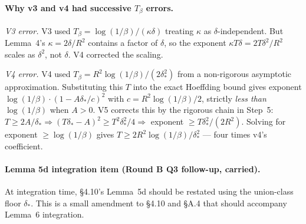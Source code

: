 \documentclass{article}
\newcommand{\deltastar}{\delta_{*}}
\newcommand{\Tbeta}{T_{\beta}}
\begin{document}
\paragraph{Why v3 and v4 had successive $\Tbeta$ errors.}
\emph{V3 error.}  V3 used $\Tbeta = \log(1/\beta)/(\kappa \delta)$
treating $\kappa$ as $\delta$-independent.  But Lemma~4's
$\kappa = 2\delta/R^2$ contains a factor of $\delta$, so the exponent
$\kappa T \delta = 2T\delta^2/R^2$ scales as $\delta^2$, not
$\delta$.  V4 corrected the scaling.

\emph{V4 error.}  V4 used $\Tbeta = R^2\log(1/\beta)/(2\deltastar^2)$
from a non-rigorous asymptotic approximation.  Substituting this
$T$ into the exact Hoeffding bound gives exponent $\log(1/\beta)
\cdot (1 - A\deltastar/c)^2$ with $c = R^2\log(1/\beta)/2$, strictly
\emph{less than} $\log(1/\beta)$ when $A > 0$.  V5 corrects this by
the rigorous chain in Step~5: $T \geq 2A/\deltastar \Rightarrow
(T\deltastar - A)^2 \geq T^2\deltastar^2/4 \Rightarrow$ exponent
$\geq T\deltastar^2/(2R^2)$.  Solving for exponent $\geq
\log(1/\beta)$ gives $T \geq 2R^2\log(1/\beta)/\deltastar^2$ — four
times v4's coefficient.

\paragraph{Lemma 5d integration item (Round B Q3 follow-up,
carried).}
At integration time, §4.10's Lemma~5d should be restated using the
union-class floor $\deltastar$.  This is a small amendment to §4.10
and §A.4 that should accompany Lemma~6 integration.
\end{document}

